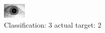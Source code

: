 \begin{figure}[h!]
\begin{center}
\includegraphics[width=0.60\columnwidth]{figures/ID1722_class_3_target_2.png}
\end{center}
\caption{ Classification: 3 actual target: 2}
\label{fig:ID1722_class_3_target_2}
\end{figure}

